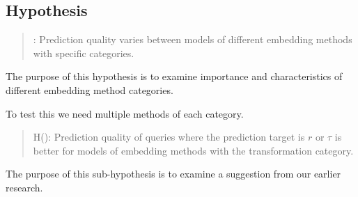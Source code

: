 \addtocounter{hcounter}{1}
\subsection{Hypothesis \thehcounter} %
\label{sec:hypothesis_\thehcounter}

\begin{quote}
:
Prediction quality varies between models of different embedding methods with specific categories.
\end{quote}

The purpose of this hypothesis is to examine importance and characteristics of different embedding method categories.

To test this we need multiple methods of each category.

\addtocounter{hsubcounter}{1}

\begin{quote}
{H\thehcounter ()}:
Prediction quality of queries where the prediction target is $r$ or $\tau$ is better for models of embedding methods with the transformation category.
\end{quote}

The purpose of this sub-hypothesis is to examine a suggestion from our earlier research.